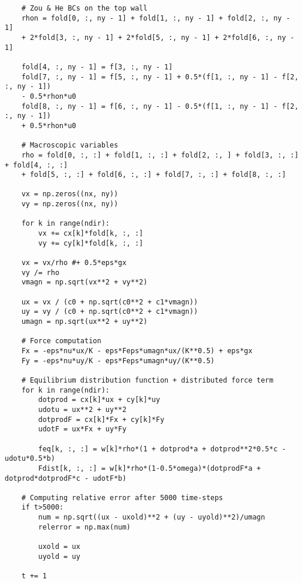 \begin{mdframed}[backgroundcolor=red!10, linecolor=red!10]
\begin{verbatim}
    # Zou & He BCs on the top wall
    rhon = fold[0, :, ny - 1] + fold[1, :, ny - 1] + fold[2, :, ny - 1] 
    + 2*fold[3, :, ny - 1] + 2*fold[5, :, ny - 1] + 2*fold[6, :, ny - 1]

    fold[4, :, ny - 1] = f[3, :, ny - 1]
    fold[7, :, ny - 1] = f[5, :, ny - 1] + 0.5*(f[1, :, ny - 1] - f[2, :, ny - 1]) 
    - 0.5*rhon*u0
    fold[8, :, ny - 1] = f[6, :, ny - 1] - 0.5*(f[1, :, ny - 1] - f[2, :, ny - 1]) 
    + 0.5*rhon*u0

    # Macroscopic variables
    rho = fold[0, :, :] + fold[1, :, :] + fold[2, :, ] + fold[3, :, :] + fold[4, :, :] 
    + fold[5, :, :] + fold[6, :, :] + fold[7, :, :] + fold[8, :, :]

    vx = np.zeros((nx, ny))
    vy = np.zeros((nx, ny))

    for k in range(ndir):
        vx += cx[k]*fold[k, :, :] 
        vy += cy[k]*fold[k, :, :]

    vx = vx/rho #+ 0.5*eps*gx 
    vy /= rho
    vmagn = np.sqrt(vx**2 + vy**2)
    
    ux = vx / (c0 + np.sqrt(c0**2 + c1*vmagn))
    uy = vy / (c0 + np.sqrt(c0**2 + c1*vmagn))
    umagn = np.sqrt(ux**2 + uy**2)

    # Force computation
    Fx = -eps*nu*ux/K - eps*Feps*umagn*ux/(K**0.5) + eps*gx
    Fy = -eps*nu*uy/K - eps*Feps*umagn*uy/(K**0.5) 
    
    # Equilibrium distribution function + distributed force term
    for k in range(ndir):
        dotprod = cx[k]*ux + cy[k]*uy
        udotu = ux**2 + uy**2
        dotprodF = cx[k]*Fx + cy[k]*Fy
        udotF = ux*Fx + uy*Fy
        
        feq[k, :, :] = w[k]*rho*(1 + dotprod*a + dotprod**2*0.5*c - udotu*0.5*b)
        Fdist[k, :, :] = w[k]*rho*(1-0.5*omega)*(dotprodF*a + dotprod*dotprodF*c - udotF*b) 

    # Computing relative error after 5000 time-steps
    if t>5000:
        num = np.sqrt((ux - uxold)**2 + (uy - uyold)**2)/umagn
        relerror = np.max(num)
        
        uxold = ux
        uyold = uy

    t += 1
\end{verbatim}
\end{mdframed}